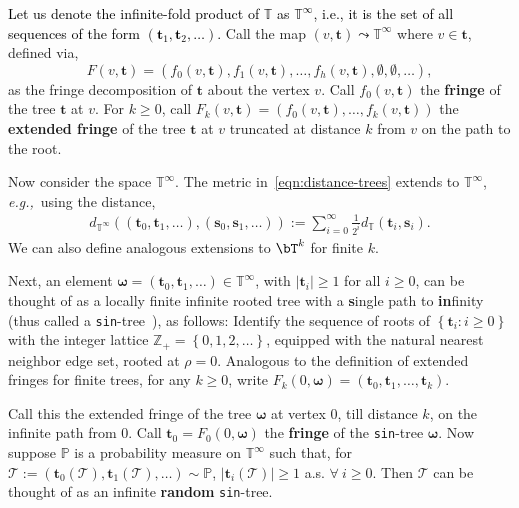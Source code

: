 \documentclass[letterpaper,11pt,reqno]{amsart}
\theoremstyle{definition}
\renewcommand{\geq}{\geqslant}
\newcommand{\set}[1]{\left\{#1\right\}}
\newcommand{\eg}{\emph{e.g.,}}
\newcommand{\bbT}{\mathbb{T}}
\newcommand{\TT}{\mathcal{T}}
\newcommand{\bs}{\mathbf{s}}
\newcommand{\bt}{\mathbf{t}}
\newcommand{\bfomega}{{\boldsymbol \omega}}
\newcommand{\Zbold}{{\mathbb{Z}}}
\newcommand{\prob}{\mathbb{P}}
\begin{document}
\textcolor{black}{Let us denote the infinite-fold product of $\bbT$ as $\bbT^{\infty}$, i.e., it is the set of all sequences of the form $(\bt_1,\bt_2,\dots)$.} Call the map $(v,\bt) \leadsto \bbT^\infty$ where $v\in \bt$, defined via, 
\[F(v, \bt) = \left(f_0(v,\bt), f_1(v,\bt) , \ldots, f_h(v,\bt), \emptyset, \emptyset, \ldots \right),\]
as the fringe decomposition of $\bt$ about the vertex $v$. Call $f_0(v,\bt)$ the {\bf fringe} of the tree $\bt$ at $v$.
For $k\geq 0$, call $F_k(v,\bt) = (f_0(v,\bt) , \ldots, f_k(v,\bt))$ the {\bf extended fringe} of the tree $\bt$ at $v$ truncated at distance $k$ from $v$ on the path to the root.

Now consider the space $\bbT^\infty$. The metric in~\eqref{eqn:distance-trees} extends  to $\bbT^\infty$, \eg\ using the distance,
\begin{align}
\label{eqn:dist-inf}
	d_{\bbT^\infty}((\bt_0, \bt_1, \ldots),(\bs_0, \bs_1, \ldots)):= \sum_{i=0}^\infty \frac{1}{2^i} d_{\bbT}(\bt_i, \bs_i). 
\end{align}
We can also define analogous extensions to $\bT^k$ for finite $k$.  

Next, an element $\bfomega = (\bt_0, \bt_1, \ldots) \in \bbT^\infty$, with $|\bt_i|\geq 1$ for all $ i\geq 0$,  can be thought of as a locally finite infinite rooted tree with a {\bf s}ingle path to {\bf in}finity (thus called a {\tt sin}-tree~\cite{aldous-fringe}), as follows: Identify the sequence of roots of $\set{\bt_i:i\geq 0}$ with the integer lattice $\Zbold_+ = \set{0,1,2,\ldots}$, equipped with the natural nearest neighbor edge set, rooted at $\rho=0$. Analogous to the definition of extended fringes for finite trees, for any $k\geq 0$, write 
$F_k(0,\bfomega)= (\bt_0, \bt_1, \ldots, \bt_k)$. 



Call this the extended fringe of the tree $\bfomega$ at vertex $0$, till distance $k$, on the infinite path from $0$. Call $\bt_0 = F_0(0,\bfomega)$ the {\bf fringe} of the {\tt sin}-tree $\bfomega$. Now suppose $\prob$ is a probability measure on $\bbT^\infty$ such that, for $\TT:= (\bt_0(\TT), \bt_1(\TT),\ldots)\sim \prob$,  $|\bt_i(\TT)|\geq 1$ a.s.  $\forall~i\geq 0$. Then $\TT$ can be thought of as an infinite {\bf random} {\tt sin}-tree. 
\end{document}
